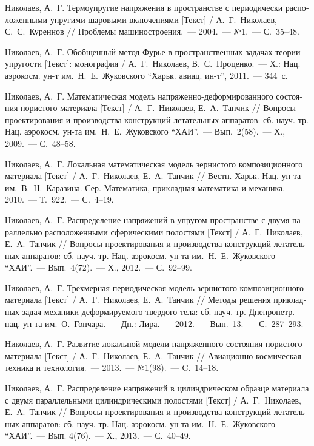 \begin{russian}
\begin{biblist}{99}
Николаев, А.~Г. 
Термоупругие напряжения в пространстве с периодически расположенными упругими шаровыми включениями [Текст] 
/ А.~Г.~Николаев, С.~С.~Куреннов 
// Проблемы машиностроения.~--- 2004.~--- №1.~--- С.~35--48.

Николаев, А.~Г. 
Обобщенный метод Фурье в пространственных задачах теории упругости [Текст]: монография 
/ А.~Г.~Николаев, В.~С.~Проценко.~--- Х.: Нац. аэрокосм. ун-т им.~Н.~Е.~Жуковского ``Харьк. авиац. ин-т'', 2011.~--- 344~с. 

Николаев, А.~Г. 
Математическая модель напряженно-деформированного состояния пористого материала [Текст] 
/ А.~Г.~Николаев, Е.~А.~Танчик 
// Вопросы проектирования и производства конструкций летательных аппаратов: сб. науч. тр. Нац. аэрокосм. ун-та им.~Н.~Е.~Жуковского ``ХАИ''.~--- Вып.~2(58).~--- Х., 2009.~--- С.~48--58.

Николаев, А.~Г. 
Локальная математическая модель зернистого композиционного материала [Текст] 
/ А.~Г.~Николаев, Е.~А.~Танчик 
// Вестн. Харьк. Нац. ун-та им.~В.~Н.~Каразина. Сер. Математика, прикладная математика и механика.~--- 2010.~--- Т.~922.~--- С.~4--19.

Николаев, А.~Г. 
Распределение напряжений в упругом пространстве с двумя параллельно расположенными сферическими полостями [Текст] 
/ А.~Г.~Николаев, Е.~А.~Танчик 
// Вопросы проектирования и производства конструкций летательных аппаратов: сб. науч. тр. Нац. аэрокосм. ун-та им.~Н.~Е.~Жуковского ``ХАИ''.~--- Вып.~4(72).~--- Х., 2012.~--- С.~92--99.

Николаев, А.~Г. 
Трехмерная периодическая модель зернистого композиционного материала [Текст] 
/ А.~Г.~Николаев, Е.~А.~Танчик 
// Методы решения прикладных задач механики деформируемого твердого тела: сб. науч. тр. Днепропетр. нац. ун-та им.~О.~Гончара.~--- Дп.: Лира.~--- 2012.~--- Вып.~13.~--- С.~287--293.

Николаев, А.~Г. 
Развитие локальной модели напряженного состояния пористого материала [Текст] 
/ А.~Г.~Николаев, Е.~А.~Танчик 
// Авиационно-космическая техника и технология.~--- 2013.~--- №1(98).~--- C.~14--18.

Николаев, А.~Г. 
Распределение напряжений в цилиндрическом образце материала с двумя параллельными цилиндрическими полостями [Текст] 
/ А.~Г.~Николаев, Е.~А.~Танчик 
// Вопросы проектирования и производства конструкций летательных аппаратов: сб. науч. тр. Нац. аэрокосм. ун-та им.~Н.~Е.~Жуковского ``ХАИ''.~--- Вып. 4(76).~--- Х., 2013.~--- С.~40--49.


\end{biblist}
\end{russian}
